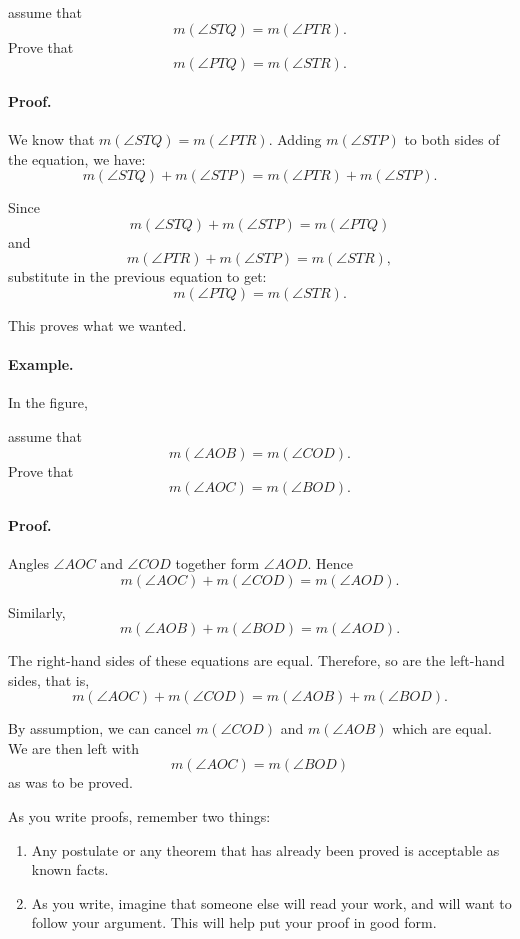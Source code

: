 \documentclass[12pt]{book} %
\begin{document}

assume that
\[
m(\angle STQ)=m(\angle PTR).
\]
Prove that
\[
m(\angle PTQ)=m(\angle STR).
\]

\paragraph{Proof.}
We know that $m(\angle STQ)=m(\angle PTR)$. Adding $m(\angle STP)$ to both sides of the equation, we have:
\[
m(\angle STQ)+m(\angle STP)=m(\angle PTR)+m(\angle STP).
\]

Since
\[
m(\angle STQ)+m(\angle STP)=m(\angle PTQ)
\]
and
\[
m(\angle PTR)+m(\angle STP)=m(\angle STR),
\]
substitute in the previous equation to get:
\[
m(\angle PTQ)=m(\angle STR).
\]

This proves what we wanted.

\paragraph{Example.}
In the figure,


assume that
\[
m(\angle AOB)=m(\angle COD).
\]
Prove that
\[
m(\angle AOC)=m(\angle BOD).
\]

\paragraph{Proof.}
Angles $\angle AOC$ and $\angle COD$ together form $\angle AOD$. Hence
\[
m(\angle AOC)+m(\angle COD)=m(\angle AOD).
\]

Similarly,
\[
m(\angle AOB)+m(\angle BOD)=m(\angle AOD).
\]

The right-hand sides of these equations are equal. Therefore, so are the left-hand sides, that is,
\[
m(\angle AOC)+m(\angle COD)=m(\angle AOB)+m(\angle BOD).
\]

By assumption, we can cancel $m(\angle COD)$ and $m(\angle AOB)$ which are equal. We are then left with
\[
m(\angle AOC)=m(\angle BOD)
\]
as was to be proved.

As you write proofs, remember two things:
\begin{enumerate}
	\item Any postulate or any theorem that has already been proved is acceptable as known facts.
	\item As you write, imagine that someone else will read your work, and will want to follow your argument. This will help put your proof in good form.
\end{enumerate}
\end{document}
